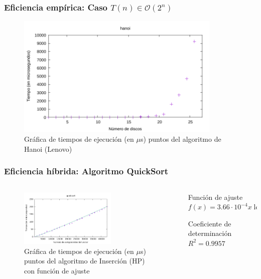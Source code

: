 \documentclass[8pt, aspectratio=169]{beamer}
\begin{document}
    \begin{frame}
        \frametitle{Eficiencia empírica: Caso $T(n) \in \mathcal{O}(2^n)$}

        \begin{figure}
            \includegraphics[width=0.87\textwidth]{../data/lenovo/hanoi-points.pdf}
            \caption{Gráfica de tiempos de ejecución (en $\mu$s) puntos del algoritmo de Hanoi (Lenovo)}
        \end{figure}
        
    \end{frame}

    \begin{frame}
        \frametitle{Eficiencia híbrida: Algoritmo QuickSort}

        \begin{columns}
            \begin{column}{0.7\textwidth}
                \begin{figure}
                    \includegraphics[width=0.65\textwidth]{../data/hp/quicksort-graph.pdf}
                    \caption{Gráfica de tiempos de ejecución (en $\mu$s) puntos del algoritmo de Inserción (HP) con función de ajuste}
                \end{figure}
            \end{column}

            \begin{column}{0.3\textwidth}
                \begin{block}{Función de ajuste}
                    $f(x) = 3.66 \cdot 10^{-4} x \log(x) + 50$
                \end{block}

                \begin{block}{Coeficiente de determinación}
                    $R^2 = 0.9957$
                \end{block}
            \end{column}
        \end{columns}
    \end{frame}
\end{document}
